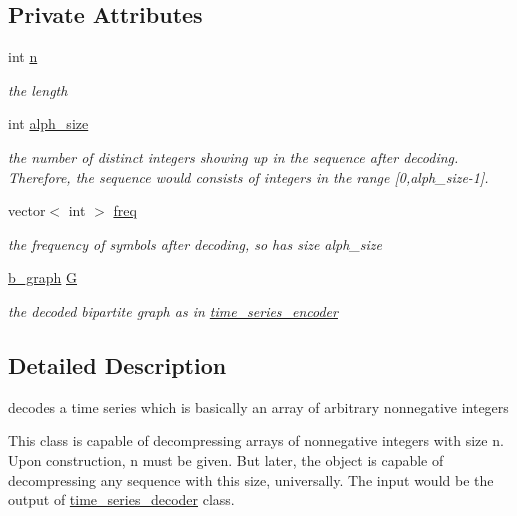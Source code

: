 \subsection*{Private Attributes}
\begin{DoxyCompactItemize}
\item 
int \hyperlink{classtime__series__decoder_a05f75c42ac2acd63766714e6e09f1a65}{n}
\begin{DoxyCompactList}\small\item\em the length \end{DoxyCompactList}\item 
int \hyperlink{classtime__series__decoder_a9e712b2d41cc124485c4d6f497504c29}{alph\+\_\+size}
\begin{DoxyCompactList}\small\item\em the number of distinct integers showing up in the sequence after decoding. Therefore, the sequence would consists of integers in the range \mbox{[}0,alph\+\_\+size-\/1\mbox{]}. \end{DoxyCompactList}\item 
vector$<$ int $>$ \hyperlink{classtime__series__decoder_a25875d5879e79eeda27588b9cbcad591}{freq}
\begin{DoxyCompactList}\small\item\em the frequency of symbols after decoding, so has size alph\+\_\+size \end{DoxyCompactList}\item 
\hyperlink{classb__graph}{b\+\_\+graph} \hyperlink{classtime__series__decoder_a66abe50babd1ebe2eb5a130d4b8091f1}{G}
\begin{DoxyCompactList}\small\item\em the decoded bipartite graph as in {\ttfamily \hyperlink{classtime__series__encoder}{time\+\_\+series\+\_\+encoder}} \end{DoxyCompactList}\end{DoxyCompactItemize}


\subsection{Detailed Description}
decodes a time series which is basically an array of arbitrary nonnegative integers 

This class is capable of decompressing arrays of nonnegative integers with size n. Upon construction, n must be given. But later, the object is capable of decompressing any sequence with this size, universally. The input would be the output of {\ttfamily \hyperlink{classtime__series__decoder}{time\+\_\+series\+\_\+decoder}} class.

